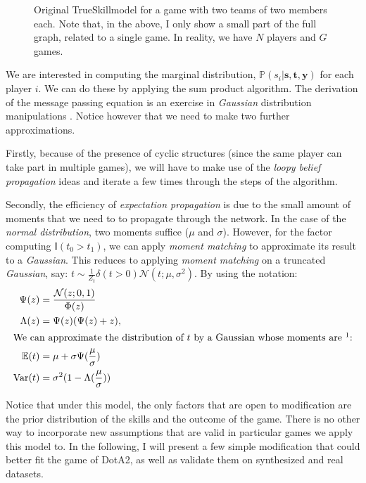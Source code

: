 \documentclass[10pt,a4]{article}
\begin{document}
\begin{figure}[ht]
	\begin{center}
	  	
	\end{center}
	\caption{Original TrueSkill\texttrademark  model for a game with two teams of
	two members each. Note that, in the above, I only show a small part of the full graph, 
	related to a single game. In reality, we have $N$ players and $G$ games.
	}
	\label{fig:stdts}
\end{figure}

We are interested in computing the marginal distribution, 
$
\mathbb{P}(s_i | \mathbf{s}, \mathbf{t}, \mathbf{y})
$ for each player $i$. We can do these by applying the sum product algorithm. 
The derivation of the message passing equation is an exercise in \emph{Gaussian}
distribution manipulations \cite{herbrich2007trueskill}. 
Notice however that we need to make two further approximations. 

Firstly, because 
of the presence of cyclic structures (since the same player can take part in 
multiple games), we will have to make use of the \emph{loopy belief propagation}
ideas and iterate a few times through the steps of the algorithm. 

Secondly, the 
efficiency of \emph{expectation propagation} is due to the small amount of moments 
that we need to to propagate through the network. In the case of the \emph{normal distribution}, two moments
suffice ($\mu$ and $\sigma$). However, for the factor computing $\mathbb{I}(t_0 > t_1)$,
we can apply \emph{moment matching} to approximate its result to a \emph{Gaussian}. 
This reduces to applying \emph{moment matching} on a truncated \emph{Gaussian}, say:
$t \sim \frac{1}{Z_t}\delta (t > 0) \mathcal{N}(t; \mu ,\sigma ^2)$. By using the 
notation:
\begin{align*}
	\Psi(z) &= \frac{\mathcal{N}(z;0, 1)}{\Phi(z)} \\
	\Lambda(z) &= \Psi(z)(\Psi(z) + z), \\
\intertext{We can approximate the distribution of $t$ by a Gaussian whose moments 
are \footnotemark:} 
	\mathbb{E}(t) &= \mu + \sigma\Psi(\frac{\mu}{\sigma}) \\ 
	\text{Var}(t) &= \sigma ^ 2 (1 - \Lambda(\frac{\mu}{\sigma}))
\end{align*}

Notice that under this model, the only factors that are open to modification are  
the prior distribution of the skills and the outcome of the game. There is no other
way to incorporate new assumptions that are valid in particular games we apply
this model to.
In the following, I will present a few simple modification that could better
fit the game of DotA2, as well as validate them on synthesized and real datasets.
\end{document}
